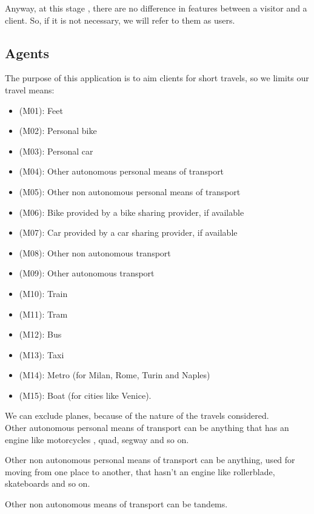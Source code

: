 \documentclass[a4paper,leqno]{book}
\begin{document}
Anyway, at this stage , there are no difference in features between a visitor and a client. 
So, if it is not necessary, we will refer to them as users.

\subsection{Agents}

The purpose of this application is to aim clients for short travels, so we limits our travel means:

\begin{itemize}

\item (M01): Feet 
\item (M02): Personal bike 
\item (M03): Personal car
\item (M04): Other autonomous personal means of transport
\item (M05): Other non autonomous personal means of transport
\item (M06): Bike provided by a bike sharing provider, if available
\item (M07): Car provided by a car sharing provider, if available
\item (M08): Other non autonomous transport
\item (M09): Other autonomous transport
\item (M10): Train
\item (M11): Tram
\item (M12): Bus 
\item (M13): Taxi
\item (M14): Metro (for Milan, Rome, Turin and Naples)
\item (M15): Boat (for cities like Venice).

\end{itemize}

We can exclude planes, because of the nature of the travels considered.\\

Other autonomous personal means of transport can be anything that has an engine like motorcycles , quad, segway and so on.

Other non autonomous personal means of transport can be anything, used for moving from one place to another, that hasn't an engine like rollerblade, skateboards and so on.

Other non autonomous means of transport can be tandems. 
\end{document}
